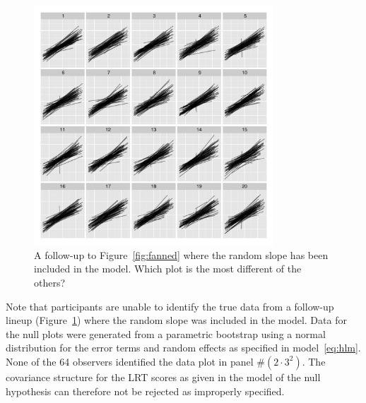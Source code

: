 \documentclass[12pt]{article}
\newcommand{\alnote}[1]{\todo[inline,color=green!40]{#1}} %
\newcommand{\hhnote}[1]{\todo[inline,color=orange!40]{#1}}
\begin{document}
\begin{figure}
	\centering
	\includegraphics[width = 0.8\textwidth]{normexam_fanned_withslope_lineup18}
	\caption{\label{fig:fanned2} A follow-up to Figure~\ref{fig:fanned} where the random slope has been included in the model. Which plot is the most different of the others?}
\end{figure}

%

{Note that participants are unable to identify the true data from a follow-up lineup (Figure~\ref{fig:fanned2}) where the random slope was included in the model.
Data for the null plots were generated from a parametric bootstrap using a normal distribution for the error terms and random effects as specified in model~\ref{eq:hlm}. 
None of the 64 observers identified the data plot in panel \#$(2\cdot 3^2)$. }
The covariance structure for the LRT scores as  given in the model of the null hypothesis    can therefore not be rejected as improperly specified. 
\end{document}
